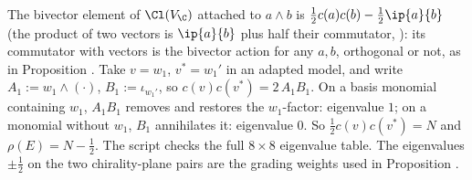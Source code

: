 The bivector element of $\Cl(V_\C)$ attached to $a\wedge b$ is $\tfrac12 c(a)c(b) - \tfrac12\ip{a}{b}$ (the product of two vectors is $\ip{a}{b}$ plus half their commutator, ): its commutator with vectors is the bivector action for any $a, b$, orthogonal or not, as in Proposition . Take $v = w_1$, $v^* = w_1'$ in an adapted model, and write $A_1 := w_1\wedge(\cdot)$, $B_1 := \iota_{w_1'}$, so $c(v)c(v^*) = 2\,A_1 B_1$. On a basis monomial containing $w_1$, $A_1B_1$ removes and restores the $w_1$-factor: eigenvalue $1$; on a monomial without $w_1$, $B_1$ annihilates it: eigenvalue $0$. So $\tfrac12 c(v)c(v^*) = N$ and $\rho(E) = N - \tfrac12$. The script checks the full $8\times 8$ eigenvalue table. The eigenvalues $\pm\tfrac12$ on the two chirality-plane pairs are the grading weights used in Proposition .
